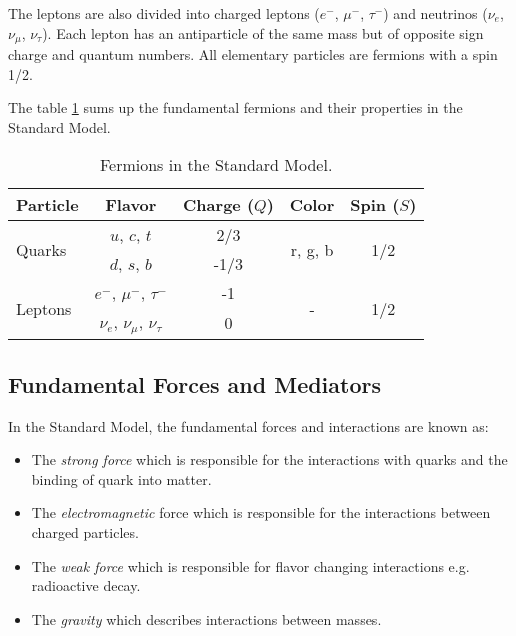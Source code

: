 The leptons are also divided into charged leptons ($e^-$, $\mu^-$, $\tau^-$) and neutrinos ($\nu_e$, $\nu_{\mu}$, $\nu_{\tau}$). Each lepton has an antiparticle of the same mass but of opposite sign charge and quantum numbers. All elementary particles are fermions with a spin 1/2.

The table \ref{table:Fermions} sums up the fundamental fermions and their properties in the Standard Model.

\begin{table}[htb!]
  \centering
  \caption{Fermions in the Standard Model.}
  \label{table:Fermions}
  \begin{tabular}{|p{3cm}||cccc|}
    \hline
    Particle & Flavor & Charge ($Q$) & Color & Spin ($S$)\\
    \hline
    \multirow{2}{*}{Quarks} & $u$, $c$, $t$ & 2/3 & \multirow{2}{*}{r, g, b} & \multirow{2}{*}{1/2}\\
    & $d$, $s$, $b$ & -1/3 & & \\
    \hline
    \multirow{2}{*}{Leptons} & $e^-$, $\mu^-$, $\tau^-$ & -1 & \multirow{2}{*}{-} & \multirow{2}{*}{1/2}\\
    & $\nu_e$, $\nu_{\mu}$, $\nu_{\tau}$ & 0 & & \\
    \hline
  \end{tabular}
\end{table}

\subsection{Fundamental Forces and Mediators}

In the Standard Model, the fundamental forces and interactions are known as:
\begin{itemize}
  \item The \textit{strong force} which is responsible for the interactions with quarks and the binding of quark into matter.
  \item The \textit{electromagnetic} force which is responsible for the interactions between charged particles.
  \item The \textit{weak force} which is responsible for flavor changing interactions e.g. radioactive decay.
  \item The \textit{gravity} which describes interactions between masses.
\end{itemize}


